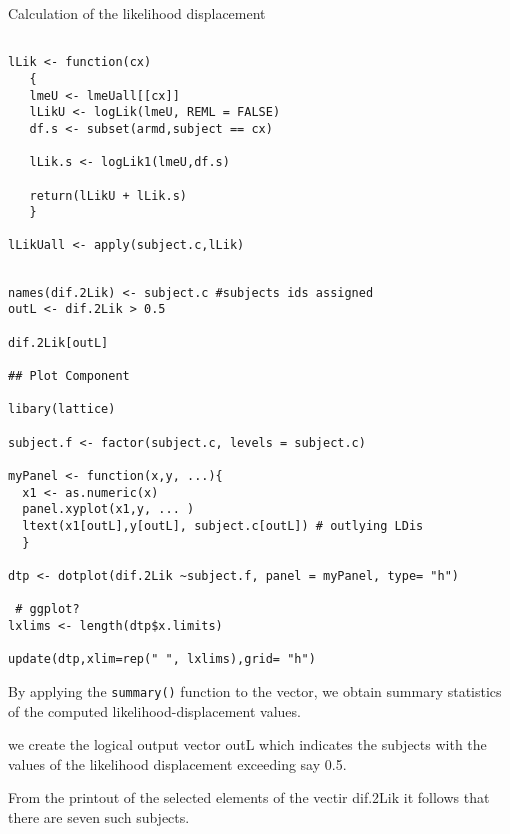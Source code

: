 \documentclass[a4paper,12pt]{article}
\begin{document}

Calculation of the likelihood displacement

\begin{framed}
\begin{verbatim}

lLik <- function(cx)
   {
   lmeU <- lmeUall[[cx]]
   lLikU <- logLik(lmeU, REML = FALSE)
   df.s <- subset(armd,subject == cx)
 
   lLik.s <- logLik1(lmeU,df.s)

   return(lLikU + lLik.s)
   }

lLikUall <- apply(subject.c,lLik)

\end{verbatim}
\end{framed}

%

\begin{framed}
\begin{verbatim}

names(dif.2Lik) <- subject.c #subjects ids assigned
outL <- dif.2Lik > 0.5

dif.2Lik[outL]

## Plot Component

libary(lattice)

subject.f <- factor(subject.c, levels = subject.c)

myPanel <- function(x,y, ...){
  x1 <- as.numeric(x)
  panel.xyplot(x1,y, ... )
  ltext(x1[outL],y[outL], subject.c[outL]) # outlying LDis
  }

dtp <- dotplot(dif.2Lik ~subject.f, panel = myPanel, type= "h")

 # ggplot?
lxlims <- length(dtp$x.limits)

update(dtp,xlim=rep(" ", lxlims),grid= "h")
\end{verbatim}
\end{framed}


By applying the \texttt{summary()} function to the vector, we obtain summary statistics of the computed likelihood-displacement values.

we create the logical output vector outL which indicates the subjects with the values of the 
likelihood displacement exceeding say 0.5.

From the printout of the selected elements of the vectir dif.2Lik it follows that there are
seven such subjects.
\end{document}
